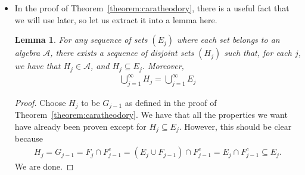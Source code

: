 \documentclass[10pt]{article}
\newtheorem{lemma}{Lemma}
\newcommand{\mcal}[1]{\mathcal{#1}}
\begin{document}
\begin{itemize}
\begin{proof}
    {\bf (Countable additivity)} In the proof of closure under countable union, we established that
    \begin{align*}
      \mu^*(A) 
      &\geq \sum_{i=1}^\infty \mu^*( A \cap E_i) + \mu^*(A \cap F^c) \\
      &\geq \mu^*\bigg( \bigcup_{i=1}^\infty (A \cap E_i) \bigg) + \mu^*(A \cap F^c) \\
      &= \mu^*( A \cap F) + \mu^*(A \cap F^c) \\
      &\geq \mu^*(A).
    \end{align*}
    Therefore, it must be the case that
    \begin{align*}
      \sum_{i=1}^\infty \mu^*( A \cap E_i) + \mu^*(A \cap F^c) 
      &= \mu^*\bigg( \bigcup_{i=1}^\infty (A \cap E_i) \bigg) + \mu^*(A \cap F^c),
    \end{align*}
    and this is true for any set $A \subseteq X$. Taking $A = F$, we have that
    \begin{align*}
      \sum_{i=1}^\infty \mu^*( F \cap E_i) + \mu^*(F \cap F^c) 
      &= \mu^*\bigg( \bigcup_{i=1}^\infty (F \cap E_i) \bigg) + \mu^*(F \cap F^c) \\
      \sum_{i=1}^\infty \mu^*( E_i ) + \mu^*(\emptyset) 
      &= \mu^*\bigg( \bigcup_{i=1}^\infty E_i \bigg) + \mu^*(\emptyset) \\
      \sum_{i=1}^\infty \mu^*( E_i )
      &= \mu^*\bigg( \bigcup_{i=1}^\infty E_i \bigg),
    \end{align*}
    which shows that $\mu^*$ is countably additive.
  \end{proof}

  \item In the proof of Theorem~\ref{theorem:caratheodory}, there is a useful fact that we will use later, so let us extract it into a lemma here.

  \begin{lemma} \label{lemma:disjoint-sequence}
    For any sequence of sets $(E_j)$ where each set belongs to an algebra $\mcal{A}$, there exists a sequence of disjoint sets $(H_j)$ such that, for each $j$, we have that $H_j \in \mcal{A}$, and $H_j \subseteq E_j$. Moreover,
    \begin{align*}
      \bigcup_{j=1}^\infty H_j = \bigcup_{j=1}^\infty E_j
    \end{align*}    
  \end{lemma}

  \begin{proof}
    Choose $H_j$ to be $G_{j-1}$ as defined in the proof of Theorem~\ref{theorem:caratheodory}. We have that all the properties we want have already been proven except for $H_j \subseteq E_j$. However, this should be clear because 
    \begin{align*}
    H_j = G_{j-1} = F_j \cap F_{j-1}^c = (E_j \cup F_{j-1}) \cap F_{j-1}^c = E_j \cap F_{j-1}^c \subseteq E_j.
    \end{align*}
    We are done.
  \end{proof}


\end{itemize}
\end{document}
